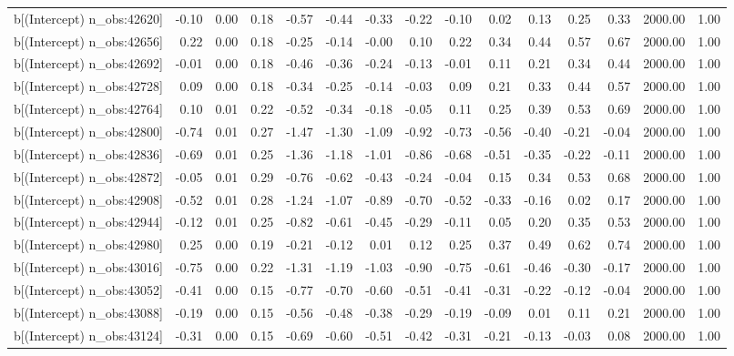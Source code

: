 \begin{table}[ht]
\begin{tabular}{rrrrrrrrrrrrrrr}
  b[(Intercept) n\_obs:42620] & -0.10 & 0.00 & 0.18 & -0.57 & -0.44 & -0.33 & -0.22 & -0.10 & 0.02 & 0.13 & 0.25 & 0.33 & 2000.00 & 1.00 \\ 
  b[(Intercept) n\_obs:42656] & 0.22 & 0.00 & 0.18 & -0.25 & -0.14 & -0.00 & 0.10 & 0.22 & 0.34 & 0.44 & 0.57 & 0.67 & 2000.00 & 1.00 \\ 
  b[(Intercept) n\_obs:42692] & -0.01 & 0.00 & 0.18 & -0.46 & -0.36 & -0.24 & -0.13 & -0.01 & 0.11 & 0.21 & 0.34 & 0.44 & 2000.00 & 1.00 \\ 
  b[(Intercept) n\_obs:42728] & 0.09 & 0.00 & 0.18 & -0.34 & -0.25 & -0.14 & -0.03 & 0.09 & 0.21 & 0.33 & 0.44 & 0.57 & 2000.00 & 1.00 \\ 
  b[(Intercept) n\_obs:42764] & 0.10 & 0.01 & 0.22 & -0.52 & -0.34 & -0.18 & -0.05 & 0.11 & 0.25 & 0.39 & 0.53 & 0.69 & 2000.00 & 1.00 \\ 
  b[(Intercept) n\_obs:42800] & -0.74 & 0.01 & 0.27 & -1.47 & -1.30 & -1.09 & -0.92 & -0.73 & -0.56 & -0.40 & -0.21 & -0.04 & 2000.00 & 1.00 \\ 
  b[(Intercept) n\_obs:42836] & -0.69 & 0.01 & 0.25 & -1.36 & -1.18 & -1.01 & -0.86 & -0.68 & -0.51 & -0.35 & -0.22 & -0.11 & 2000.00 & 1.00 \\ 
  b[(Intercept) n\_obs:42872] & -0.05 & 0.01 & 0.29 & -0.76 & -0.62 & -0.43 & -0.24 & -0.04 & 0.15 & 0.34 & 0.53 & 0.68 & 2000.00 & 1.00 \\ 
  b[(Intercept) n\_obs:42908] & -0.52 & 0.01 & 0.28 & -1.24 & -1.07 & -0.89 & -0.70 & -0.52 & -0.33 & -0.16 & 0.02 & 0.17 & 2000.00 & 1.00 \\ 
  b[(Intercept) n\_obs:42944] & -0.12 & 0.01 & 0.25 & -0.82 & -0.61 & -0.45 & -0.29 & -0.11 & 0.05 & 0.20 & 0.35 & 0.53 & 2000.00 & 1.00 \\ 
  b[(Intercept) n\_obs:42980] & 0.25 & 0.00 & 0.19 & -0.21 & -0.12 & 0.01 & 0.12 & 0.25 & 0.37 & 0.49 & 0.62 & 0.74 & 2000.00 & 1.00 \\ 
  b[(Intercept) n\_obs:43016] & -0.75 & 0.00 & 0.22 & -1.31 & -1.19 & -1.03 & -0.90 & -0.75 & -0.61 & -0.46 & -0.30 & -0.17 & 2000.00 & 1.00 \\ 
  b[(Intercept) n\_obs:43052] & -0.41 & 0.00 & 0.15 & -0.77 & -0.70 & -0.60 & -0.51 & -0.41 & -0.31 & -0.22 & -0.12 & -0.04 & 2000.00 & 1.00 \\ 
  b[(Intercept) n\_obs:43088] & -0.19 & 0.00 & 0.15 & -0.56 & -0.48 & -0.38 & -0.29 & -0.19 & -0.09 & 0.01 & 0.11 & 0.21 & 2000.00 & 1.00 \\ 
  b[(Intercept) n\_obs:43124] & -0.31 & 0.00 & 0.15 & -0.69 & -0.60 & -0.51 & -0.42 & -0.31 & -0.21 & -0.13 & -0.03 & 0.08 & 2000.00 & 1.00 \\ 

\end{tabular}
\end{table}
